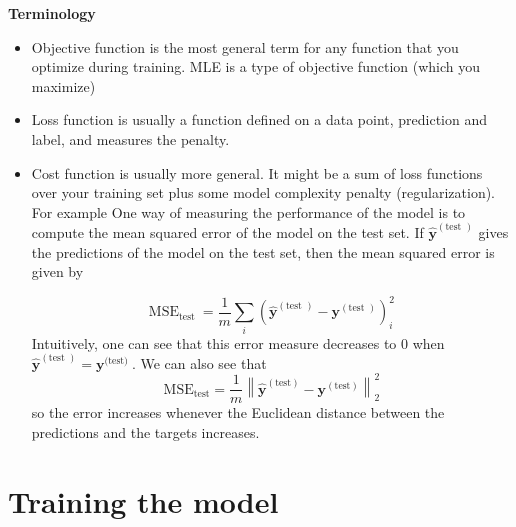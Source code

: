\documentclass[openany]{book}
\begin{document}
\noindent
\textbf{Terminology}

\begin{itemize}
    \item Objective function is the most general term for any function that you optimize during training. MLE is a type of objective function (which you maximize)

    \item Loss function is usually a function defined on a data point, prediction and label, and measures the penalty. 

    \item Cost function is usually more general. It might be a sum of loss functions over your training set plus some model complexity penalty (regularization). For example One way of measuring the performance of the model is to compute the mean squared error of the model on the test set. If $\hat{\boldsymbol{y}}^{(\text {test }) }
$ gives the predictions of the  model on the test set, then the mean squared error is given by

$$
\mathrm{MSE}_{\text {test }}=\frac{1}{m} \sum_{i}\left(\hat{\boldsymbol{y}}^{(\text {test })}-\boldsymbol{y}^{(\text {test })}\right)_{i}^{2}
$$
Intuitively, one can see that this error measure decreases to 0 when $\hat{\boldsymbol{y}}^{(\text {test })}=\boldsymbol{y}^{\text {(test) }}$. We can also see that
$$
\mathrm{MSE}_{\mathrm{test}}=\frac{1}{m}\left\|\hat{\boldsymbol{y}}^{(\mathrm{test})}-\boldsymbol{y}^{(\mathrm{test})}\right\|_{2}^{2}
$$
so the error increases whenever the Euclidean distance between the predictions and the targets increases.



\end{itemize}




\section{Training the model}
\end{document}
